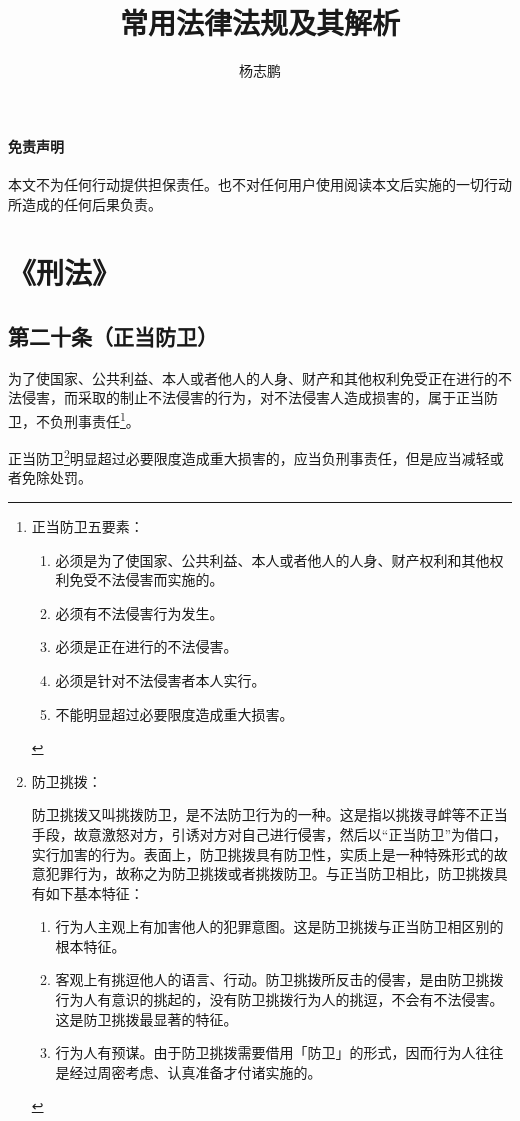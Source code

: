 \documentclass[utf-8,10pt]{ctexart}%
\title{\textbf{常用法律法规及其解析}}
\author{杨志鹏}
\begin{document}
\maketitle
\newpage
\tableofcontents
\pagestyle{fancy}
\newpage{}
\paragraph{}
\noindent{}
\paragraph{免责声明}
本文不为任何行动提供担保责任。也不对任何用户使用阅读本文后实施的一切行动所造成的任何后果负责。
\section{《刑法》}
\subsection{第二十条（正当防卫）}
为了使国家、公共利益、本人或者他人的人身、财产和其他权利免受正在进行的不法侵害，而采取的制止不法侵害的行为，对不法侵害人造成损害的，属于正当防卫，不负刑事责任\footnote{
正当防卫五要素：
\begin{enumerate}
\item 必须是为了使国家、公共利益、本人或者他人的人身、财产权利和其他权利免受不法侵害而实施的。
\item 必须有不法侵害行为发生。
\item 必须是正在进行的不法侵害。
\item 必须是针对不法侵害者本人实行。
\item 不能明显超过必要限度造成重大损害。
\end{enumerate}
}。

正当防卫\footnote{防卫挑拨：


防卫挑拨又叫挑拨防卫，是不法防卫行为的一种。这是指以挑拨寻衅等不正当手段，故意激怒对方，引诱对方对自己进行侵害，然后以“正当防卫”为借口，实行加害的行为。表面上，防卫挑拨具有防卫性，实质上是一种特殊形式的故意犯罪行为，故称之为防卫挑拨或者挑拨防卫。与正当防卫相比，防卫挑拨具有如下基本特征：
\begin{enumerate}
\item 行为人主观上有加害他人的犯罪意图。这是防卫挑拨与正当防卫相区别的根本特征。
\item 客观上有挑逗他人的语言、行动。防卫挑拨所反击的侵害，是由防卫挑拨行为人有意识的挑起的，没有防卫挑拨行为人的挑逗，不会有不法侵害。这是防卫挑拨最显著的特征。
\item 行为人有预谋。由于防卫挑拨需要借用「防卫」的形式，因而行为人往往是经过周密考虑、认真准备才付诸实施的。
\end{enumerate}

}明显超过必要限度造成重大损害的，应当负刑事责任，但是应当减轻或者免除处罚。
\end{document}
